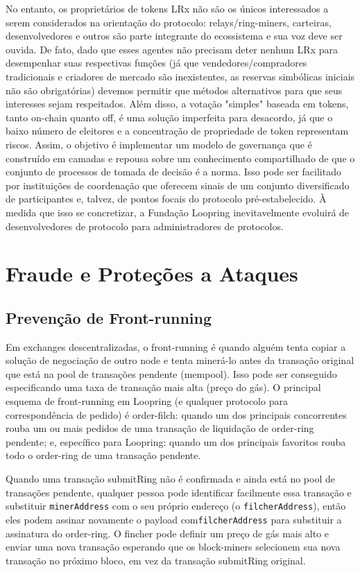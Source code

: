\documentclass[UTF8,nofonts]{article}
\begin{document}
\begin{multicols}{2}
No entanto, os proprietários de tokens LRx não são os únicos interessados ​​a serem considerados na orientação do protocolo: relays/ring-miners, carteiras, desenvolvedores e outros são parte integrante do ecossistema e sua voz deve ser ouvida. De fato, dado que esses agentes não precisam deter nenhum LRx para desempenhar suas respectivas funções (já que vendedores/compradores tradicionais e criadores de mercado são inexistentes, as reservas simbólicas iniciais não são obrigatórias) devemos permitir que métodos alternativos para que seus interesses sejam respeitados. Além disso, a votação "simples" baseada em tokens, tanto on-chain quanto off, é uma solução imperfeita para desacordo, já que o baixo número de eleitores e a concentração de propriedade de token representam riscos. Assim, o objetivo é implementar um modelo de governança que é construído em camadas e repousa sobre um conhecimento compartilhado de que o conjunto de processos de tomada de decisão é a norma. Isso pode ser facilitado por instituições de coordenação que oferecem sinais de um conjunto diversificado de participantes e, talvez, de pontos focais do protocolo pré-estabelecido. À medida que isso se concretizar, a Fundação Loopring inevitavelmente evoluirá de desenvolvedores de protocolo para administradores de protocolos.

\section{Fraude e Proteções a Ataques}

\subsection{Prevenção de Front-running\label{sec:dual_authoring}}

Em exchanges descentralizadas, o front-running é quando alguém tenta copiar a solução de negociação de outro node e tenta minerá-lo antes da transação original que está na pool de transações pendente (mempool). Isso pode ser conseguido especificando uma taxa de transação mais alta (preço do gás). O principal esquema de front-running em Loopring (e qualquer protocolo para correspondência de pedido) é order-filch: quando um dos principais concorrentes rouba um ou mais pedidos de uma transação de liquidação de order-ring pendente; e, específico para Loopring: quando um dos principais favoritos rouba todo o order-ring de uma transação pendente.


Quando uma transação submitRing não é confirmada e ainda está no pool de transações pendente, qualquer pessoa pode identificar facilmente essa transação e substituir \verb|minerAddress| com o seu próprio endereço (o \verb|filcherAddress|), então eles podem assinar novamente o payload com\verb|filcherAddress| para substituir a assinatura do order-ring. O fincher pode definir um preço de gás mais alto e enviar uma nova transação esperando que os block-miners selecionem sua nova transação no próximo bloco, em vez da transação submitRing original.


\end{multicols}
\end{document}
